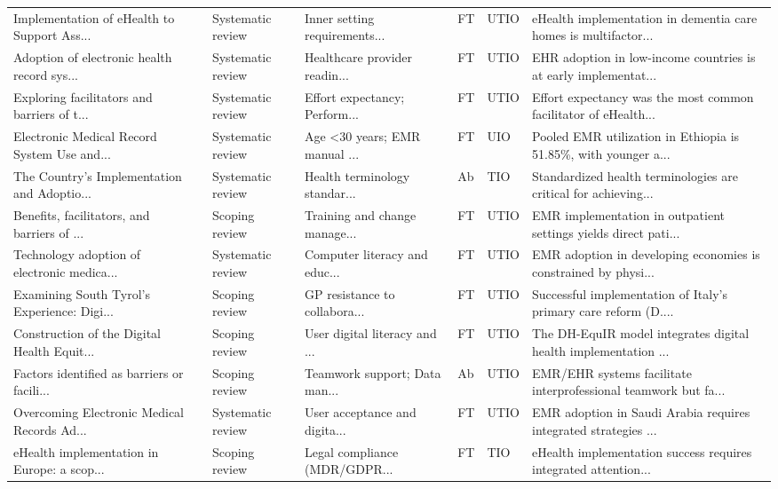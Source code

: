 \begin{longtable}{p{3.4cm} >{\centering\arraybackslash}p{0.7cm} p{1.9cm} p{2.4cm} >{\centering\arraybackslash}p{0.8cm} >{\centering\arraybackslash}p{1.1cm} p{3.4cm}}
Implementation of eHealth to Support Ass... & 2022 & Systematic review & Inner setting requirements... & FT & UTIO & eHealth implementation in dementia care homes is multifactor... \\
Adoption of electronic health record sys... & 2023 & Systematic review & Healthcare provider readin... & FT & UTIO & EHR adoption in low-income countries is at early implementat... \\
Exploring facilitators and barriers of t... & 2023 & Systematic review & Effort expectancy; Perform... & FT & UTIO & Effort expectancy was the most common facilitator of eHealth... \\
Electronic Medical Record System Use and... & 2023 & Systematic review & Age <30 years; EMR manual ... & FT & UIO & Pooled EMR utilization in Ethiopia is 51.85\%, with younger a... \\
The Country's Implementation and Adoptio... & 2023 & Systematic review & Health terminology standar... & Ab & TIO & Standardized health terminologies are critical for achieving... \\
Benefits, facilitators, and barriers of ... & 2024 & Scoping review & Training and change manage... & FT & UTIO & EMR implementation in outpatient settings yields direct pati... \\
Technology adoption of electronic medica... & 2024 & Systematic review & Computer literacy and educ... & FT & UTIO & EMR adoption in developing economies is constrained by physi... \\
Examining South Tyrol's Experience: Digi... & 2024 & Scoping review & GP resistance to collabora... & FT & UTIO & Successful implementation of Italy's primary care reform (D.... \\
Construction of the Digital Health Equit... & 2024 & Scoping review & User digital literacy and ... & FT & UTIO & The DH-EquIR model integrates digital health implementation ... \\
Factors identified as barriers or facili... & 2024 & Scoping review & Teamwork support; Data man... & Ab & UTIO & EMR/EHR systems facilitate interprofessional teamwork but fa... \\
Overcoming Electronic Medical Records Ad... & 2024 & Systematic review & User acceptance and digita... & FT & UTIO & EMR adoption in Saudi Arabia requires integrated strategies ... \\
eHealth implementation in Europe: a scop... & 2024 & Scoping review & Legal compliance (MDR/GDPR... & FT & TIO & eHealth implementation success requires integrated attention... \\

\end{longtable}
